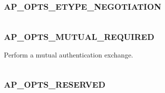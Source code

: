 \documentclass[letterpaper,10pt,english]{sphinxmanual}
\begin{document}
\subsubsection{AP\_OPTS\_ETYPE\_NEGOTIATION}
\label{appdev/refs/macros/AP_OPTS_ETYPE_NEGOTIATION::doc}\label{appdev/refs/macros/AP_OPTS_ETYPE_NEGOTIATION:ap-opts-etype-negotiation}\label{appdev/refs/macros/AP_OPTS_ETYPE_NEGOTIATION:ap-opts-etype-negotiation-data}

\begin{fulllineitems}
\label{appdev/refs/macros/AP_OPTS_ETYPE_NEGOTIATION:AP_OPTS_ETYPE_NEGOTIATION}
\end{fulllineitems}


\begin{tabulary}{\linewidth}{|L|L|}
\hline

 & 
\\\hline
\end{tabulary}



\subsubsection{AP\_OPTS\_MUTUAL\_REQUIRED}
\label{appdev/refs/macros/AP_OPTS_MUTUAL_REQUIRED:ap-opts-mutual-required}\label{appdev/refs/macros/AP_OPTS_MUTUAL_REQUIRED:ap-opts-mutual-required-data}\label{appdev/refs/macros/AP_OPTS_MUTUAL_REQUIRED::doc}

\begin{fulllineitems}
\label{appdev/refs/macros/AP_OPTS_MUTUAL_REQUIRED:AP_OPTS_MUTUAL_REQUIRED}
\end{fulllineitems}


Perform a mutual authentication exchange.

\begin{tabulary}{\linewidth}{|L|L|}
\hline

 & 
\\\hline
\end{tabulary}



\subsubsection{AP\_OPTS\_RESERVED}
\label{appdev/refs/macros/AP_OPTS_RESERVED::doc}\label{appdev/refs/macros/AP_OPTS_RESERVED:ap-opts-reserved-data}\label{appdev/refs/macros/AP_OPTS_RESERVED:ap-opts-reserved}
\end{document}
